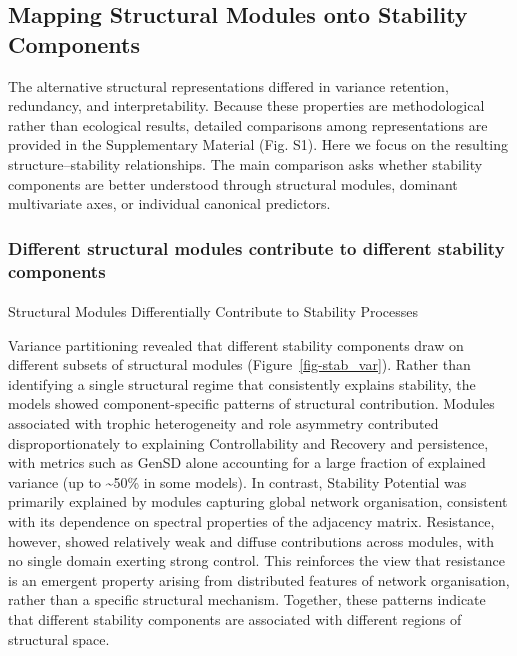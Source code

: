 \documentclass[
]{article}
\makeatletter
\let\oldparagraph\paragraph
\renewcommand{\paragraph}{
    \@ifstar
      \xxxParagraphStar
      \xxxParagraphNoStar
  }
\newcommand{\xxxParagraphStar}[1]{\oldparagraph*{#1}\mbox{}}
\newcommand{\xxxParagraphNoStar}[1]{\oldparagraph{#1}\mbox{}}
\makeatother
\begin{document}
\subsection{Mapping Structural Modules onto Stability
Components}\label{mapping-structural-modules-onto-stability-components}

The alternative structural representations differed in variance
retention, redundancy, and interpretability. Because these properties
are methodological rather than ecological results, detailed comparisons
among representations are provided in the Supplementary Material (Fig.
S1). Here we focus on the resulting structure--stability relationships.
The main comparison asks whether stability components are better
understood through structural modules, dominant multivariate axes, or
individual canonical predictors.

\subsubsection{Different structural modules contribute to different
stability
components}\label{different-structural-modules-contribute-to-different-stability-components}

\paragraph{Structural Modules Differentially Contribute to Stability
Processes}\label{structural-modules-differentially-contribute-to-stability-processes}

Variance partitioning revealed that different stability components draw
on different subsets of structural modules (Figure~\ref{fig-stab_var}).
Rather than identifying a single structural regime that consistently
explains stability, the models showed component-specific patterns of
structural contribution. Modules associated with trophic heterogeneity
and role asymmetry contributed disproportionately to explaining
Controllability and Recovery and persistence, with metrics such as GenSD
alone accounting for a large fraction of explained variance (up to
\textasciitilde50\% in some models). In contrast, Stability Potential
was primarily explained by modules capturing global network
organisation, consistent with its dependence on spectral properties of
the adjacency matrix. Resistance, however, showed relatively weak and
diffuse contributions across modules, with no single domain exerting
strong control. This reinforces the view that resistance is an emergent
property arising from distributed features of network organisation,
rather than a specific structural mechanism. Together, these patterns
indicate that different stability components are associated with
different regions of structural space.
\end{document}
